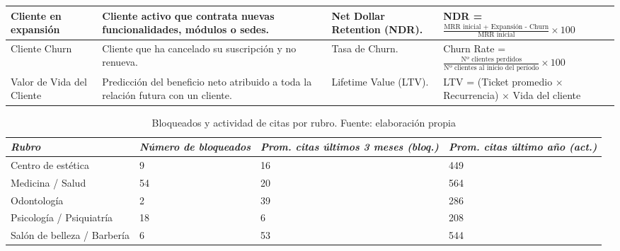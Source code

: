 \begin{appendixd}
\begin{table}[H]
\begin{threeparttable}
\begin{tabular}{|l|C{3.5cm}|C{3.3cm}|C{5.5cm}|}
      \hline
      Cliente en expansión & Cliente activo que contrata nuevas funcionalidades, módulos o sedes. &
      Net Dollar Retention (NDR). &
      NDR = $\tfrac{\text{MRR inicial + Expansión - Churn}}{\text{MRR inicial}} \times 100$ \\
      \hline
      Cliente Churn & Cliente que ha cancelado su suscripción y no renueva. &
      Tasa de Churn. &
      Churn Rate = $\tfrac{\text{Nº clientes perdidos}}{\text{Nº clientes al inicio del período}} \times 100$ \\
      \hline
      Valor de Vida del Cliente & Predicción del beneficio neto atribuido a toda la relación futura con un cliente. &
      Lifetime Value (LTV). &
      LTV = (Ticket promedio $\times$ Recurrencia) $\times$ Vida del cliente \\
      \hline
    \end{tabular}
    \label{tab:estados-cliente}
  \end{threeparttable}
\end{table}

\newpage



\begin{table}[H]
    \centering
    \caption{Bloqueados y actividad de citas por rubro. Fuente: elaboración propia}
    \begin{tabular}{|l|C{3.2cm}|C{3.3cm}|C{3.5cm}|}
        \hline
        \textit{Rubro} & \textit{Número de bloqueados} & \textit{Prom. citas últimos 3 meses (bloq.)} & \textit{Prom. citas último año (act.)} \bigstrut\\
        \hline
        Centro de estética & 9  & 16 & 449 \bigstrut[t]\\
        Medicina / Salud & 54 & 20 & 564 \\
        Odontología & 2 & 39 & 286 \\
        Psicología / Psiquiatría & 18 & 6 & 208 \\
        Salón de belleza / Barbería & 6 & 53 & 544 \bigstrut[b]\\
        \hline
    \end{tabular}
    \label{tab:citas_bloq_act_rubro}
\end{table}


\end{appendixd}
